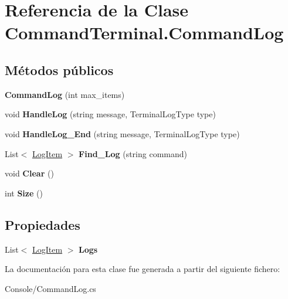 \hypertarget{class_command_terminal_1_1_command_log}{}\section{Referencia de la Clase Command\+Terminal.\+Command\+Log}
\label{class_command_terminal_1_1_command_log}
\subsection*{Métodos públicos}
\begin{DoxyCompactItemize}
\item 
\mbox{\label{class_command_terminal_1_1_command_log_a1e8323467312989d520bb41e5b544336}} 
{\bfseries Command\+Log} (int max\+\_\+items)
\item 
\mbox{\label{class_command_terminal_1_1_command_log_ae51ecfc86979778ea965b5aa737db744}} 
void {\bfseries Handle\+Log} (string message, Terminal\+Log\+Type type)
\item 
\mbox{\label{class_command_terminal_1_1_command_log_a495c15dfa1c015a7b5d029b7416fd906}} 
void {\bfseries Handle\+Log\+\_\+\+End} (string message, Terminal\+Log\+Type type)
\item 
\mbox{\label{class_command_terminal_1_1_command_log_a260ddad4a7c77ac38a0951c6b73b066a}} 
List$<$ \mbox{\hyperlink{struct_command_terminal_1_1_log_item}{Log\+Item}} $>$ {\bfseries Find\+\_\+\+Log} (string command)
\item 
\mbox{\label{class_command_terminal_1_1_command_log_a057f3008fd63b0ba047e31649584715f}} 
void {\bfseries Clear} ()
\item 
\mbox{\label{class_command_terminal_1_1_command_log_a89057cc469791017cfbf27bbd8a74e86}} 
int {\bfseries Size} ()
\end{DoxyCompactItemize}
\subsection*{Propiedades}
\begin{DoxyCompactItemize}
\item 
\mbox{\label{class_command_terminal_1_1_command_log_a856e252795994b69fbe9448a3ea9efc8}} 
List$<$ \mbox{\hyperlink{struct_command_terminal_1_1_log_item}{Log\+Item}} $>$ {\bfseries Logs}
\end{DoxyCompactItemize}


La documentación para esta clase fue generada a partir del siguiente fichero\+:\begin{DoxyCompactItemize}
\item 
Console/Command\+Log.\+cs\end{DoxyCompactItemize}
